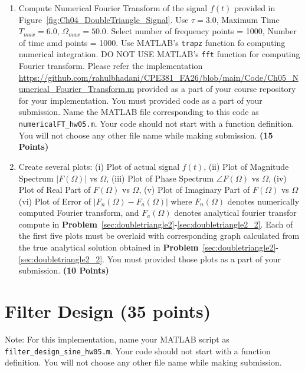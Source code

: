 \documentclass[12pt, xcolor=dvipsnames,svgnames,x11names]{article}
\begin{document}
\begin{enumerate}

\item Compute Numerical Fourier Transform of the signal $f(t)$ provided in Figure~\ref{fig:Ch04_DoubleTriangle_Signal}. Use $\tau = 3.0$, Maximum Time $T_{max} = 6.0$, $ \Omega_{max} = 50.0$. Select number of frequency points = 1000, Number of time amd points = 1000. Use MATLAB's \texttt{trapz} function fo computing numerical integration. DO NOT USE MATLAB's \texttt{fft} function for computing Fourier transform. Please refer the implementation \url{https://github.com/rahulbhadani/CPE381_FA26/blob/main/Code/Ch05_Numerical_Fourier_Transform.m} provided as a part of your course repository for your implementation. You must provided code as a part of your submission. Name the MATLAB file corresponding to this code as \texttt{numericalFT\_hw05.m}. Your code should not start with a function definition. You will not choose any other file name while making submission. \hfill \textbf{(15 Points)}


\item Create several plots: (i) Plot of actual signal $f(t)$, (ii) Plot of Magnitude Spectrum $|F(\Omega)|$ vs $\Omega$, (iii) Plot of Phase Spectrum $\angle F(\Omega)$ vs $\Omega$, (iv) Plot of Real Part of $F(\Omega)$ vs $\Omega$, (v) Plot of Imaginary Part of $F(\Omega)$ vs $\Omega$ (vi) Plot of Error of $| F_n(\Omega) - F_a(\Omega)|$ where $F_n(\Omega) $ denotes numerically computed Fourier transform, and $F_a(\Omega)$ denotes analytical fourier transfor compute in \textbf{Problem}~\ref{sec:doubletriangle2}-\ref{sec:doubletriangle2_2}. Each of the first five plots must be overlaid with corresponding graph calculated from the true analytical solution obtained in \textbf{Problem}~\ref{sec:doubletriangle2}-\ref{sec:doubletriangle2_2}. You must provided those plots as a part of your submission. \hfill \textbf{(10 Points)}

\end{enumerate}


\section{Filter Design (35 points)}

Note: For this implementation, name your MATLAB script as \texttt{filter\_design\_sine\_hw05.m}. Your code should not start with a function definition. You will not choose any other file name while making submission.
\end{document}
